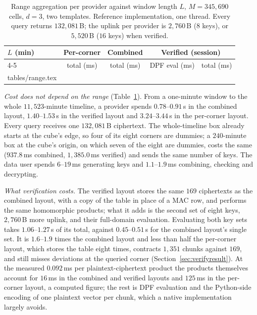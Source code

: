 \documentclass[a4paper,fleqn]{cas-sc}
\begin{document}
\begin{table}[pos=htbp]
\caption{Range aggregation per provider against window length $L$,
$M=345{,}690$ cells, $d=3$, two templates. Reference implementation, one
thread. Every query returns $132{,}081$\,B; the uplink per provider is
$2{,}760$\,B ($8$ keys), or $5{,}520$\,B ($16$ keys) when verified.}
\label{tab:range}
\centering
\footnotesize
\begin{tabular*}{\tblwidth}{@{\extracolsep{\fill}}lcccc@{}}
\toprule
$L$ (min) & Per-corner & Combined & \multicolumn{2}{c}{Verified (session)} \\
\cmidrule(lr){4-5}
 & total (ms) & total (ms) & DPF eval (ms) & total (ms) \\
\midrule
{} tables/range.tex 
\bottomrule
\end{tabular*}
\end{table}

\emph{Cost does not depend on the range} (Table~\ref{tab:range}). From a
one-minute window to the whole $11{,}523$-minute timeline, a provider spends
$0.78$--$0.91$\,s in the combined layout, $1.40$--$1.53$\,s in the verified
layout and $3.24$--$3.44$\,s in the per-corner layout. Every query receives one
$132{,}081$\,B ciphertext. The whole-timeline box already starts at the cube's
edge, so four of its eight corners are dummies; a $240$-minute box at the
cube's origin, on which seven of the eight are dummies, costs the same
($937.8$\,ms combined, $1{,}385.0$\,ms verified) and sends the same number of
keys. The data user spends $6$--$19$\,ms generating keys and $1.1$--$1.9$\,ms
combining, checking and decrypting.

\emph{What verification costs.} The verified layout stores the same $169$
ciphertexts as the combined layout, with a copy of the table in place of a MAC
row, and performs the same homomorphic products; what it adds is the second
set of eight keys, $2{,}760$\,B more uplink, and their full-domain evaluation.
Evaluating both key sets takes $1.06$--$1.27$\,s of its total, against
$0.45$--$0.51$\,s for the combined layout's single set. It is $1.6$--$1.9$ times
the combined layout and less than half the per-corner layout, which stores the
table eight times, contracts $1{,}351$ chunks against $169$, and still misses
deviations at the queried corner (Section~\ref{sec:verifyresult}). At the
measured $0.092$\,ms per plaintext-ciphertext product the products themselves
account for $16$\,ms in the combined and verified layouts and $125$\,ms in the
per-corner layout, a computed figure; the rest is DPF evaluation and the
Python-side encoding of one plaintext vector per chunk, which a native
implementation largely avoids.
\end{document}
